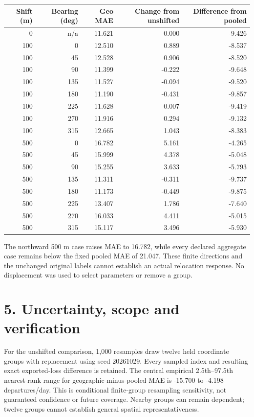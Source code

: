 \documentclass[11pt]{article}
\begin{document}
\begin{center}\small\setlength{\tabcolsep}{4pt}
\begin{tabular}{rrrrr}\toprule
Shift (m) & Bearing (deg) & Geo MAE & Change from unshifted & Difference from pooled \\
\midrule
0 & n/a & 11.621 & 0.000 & -9.426 \\
100 & 0 & 12.510 & 0.889 & -8.537 \\
100 & 45 & 12.528 & 0.906 & -8.520 \\
100 & 90 & 11.399 & -0.222 & -9.648 \\
100 & 135 & 11.527 & -0.094 & -9.520 \\
100 & 180 & 11.190 & -0.431 & -9.857 \\
100 & 225 & 11.628 & 0.007 & -9.419 \\
100 & 270 & 11.916 & 0.294 & -9.132 \\
100 & 315 & 12.665 & 1.043 & -8.383 \\
500 & 0 & 16.782 & 5.161 & -4.265 \\
500 & 45 & 15.999 & 4.378 & -5.048 \\
500 & 90 & 15.255 & 3.633 & -5.793 \\
500 & 135 & 11.311 & -0.311 & -9.737 \\
500 & 180 & 11.173 & -0.449 & -9.875 \\
500 & 225 & 13.407 & 1.786 & -7.640 \\
500 & 270 & 16.033 & 4.411 & -5.015 \\
500 & 315 & 15.117 & 3.496 & -5.930 \\
\bottomrule\end{tabular}\end{center}
The northward 500 m case raises MAE to 16.782, while every declared aggregate case remains below the fixed pooled MAE of 21.047. These finite directions and the unchanged original labels cannot establish an actual relocation response. No displacement was used to select parameters or remove a group.

\newpage\section*{5. Uncertainty, scope and verification}
For the unshifted comparison, 1,000 resamples draw twelve held coordinate groups with replacement using seed 20261029. Every sampled index and resulting exact exported-loss difference is retained. The central empirical 2.5th--97.5th nearest-rank range for geographic-minus-pooled MAE is -15.700 to -4.198 departures/day. This is conditional finite-group resampling sensitivity, not guaranteed confidence or future coverage. Nearby groups can remain dependent; twelve groups cannot establish general spatial representativeness.
\end{document}
